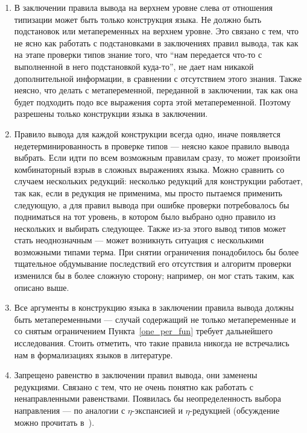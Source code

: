 \begin{enumerate}

\item \label{funsym_concl} В заключении правила вывода на верхнем уровне слева от отношения типизации может быть только конструкция языка. Не должно быть подстановок или метапеременных на верхнем уровне. Это связано с тем, что не ясно как работать с подстановками в заключениях правил вывода, так как на этапе проверки типов знание того, что ``нам передается что-то с выполненной в него подстановкой куда-то'', не дает нам никакой дополнительной информации, в сравнении с отсутствием этого знания. Также неясно, что делать с метапеременной, переданной в заключении, так как она будет подходить подо все выражения сорта этой метапеременной. Поэтому разрешены только конструкции языка в заключении.

\item \label{one_per_fun} Правило вывода для каждой конструкции всегда одно, иначе появляется недетерминированность в проверке типов --- неясно какое правило вывода выбрать. Если идти по всем возможным правилам сразу, то может произойти комбинаторный взрыв в сложных выражениях языка. Можно сравнить со случаем нескольких редукций: несколько редукций для конструкции работает, так как, если в редукция не применима, мы просто пытаемся применить следующую, а для правил вывода при ошибке проверки потребовалось бы подниматься на тот уровень, в котором было выбрано одно правило из нескольких и выбирать следующее. Также из-за этого вывод типов может стать неоднозначным --- может возникнуть ситуация с несколькими возможными типами терма. При снятии ограничения понадобилось бы более тщательное обдумывание последствий его отсутствия и алгоритм проверки изменился бы в более сложную сторону; например, он мог стать таким, как описано выше.

\item \label{const_metas} Все аргументы в конструкцию языка в заключении правила вывода должны быть метапеременными --- случай содержащий не только метапеременные и со снятым ограничением Пункта~\ref{one_per_fun} требует дальнейшего исследования. Стоить отметить, что такие правила никогда не встречались нам в формализациях языков в литературе.

\item Запрещено равенство в заключении правил вывода, они заменены редукциями. Связано с тем, что не очень понятно как работать с ненаправленными равенствами. Появилась бы неопределенность выбора направления --- по аналогии с $\eta$-экспансией и $\eta$-редукцией (обсуждение можно прочитать в~\cite{ncat:eta}).


\end{enumerate}
